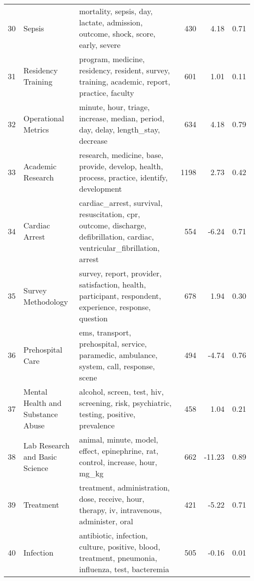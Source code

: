 \begin{tabular}{rllrrr}
    30 &                                       Sepsis &                                             mortality, sepsis, day, lactate, admission, outcome, shock, score, early, severe &             430 &              4.18 &  0.71 \\
    31 &                           Residency Training &                                program, medicine, residency, resident, survey, training, academic, report, practice, faculty &             601 &              1.01 &  0.11 \\
    32 &                          Operational Metrics &                                            minute, hour, triage, increase, median, period, day, delay, length\_stay, decrease &             634 &              4.18 &  0.79 \\
    33 &                            Academic Research &                                 research, medicine, base, provide, develop, health, process, practice, identify, development &            1198 &              2.73 &  0.42 \\
    34 &                               Cardiac Arrest &  cardiac\_arrest, survival, resuscitation, cpr, outcome, discharge, defibrillation, cardiac, ventricular\_fibrillation, arrest &             554 &             -6.24 &  0.71 \\
    35 &                           Survey Methodology &                      survey, report, provider, satisfaction, health, participant, respondent, experience, response, question &             678 &              1.94 &  0.30 \\
    36 &                             Prehospital Care &                                    ems, transport, prehospital, service, paramedic, ambulance, system, call, response, scene &             494 &             -4.74 &  0.76 \\
    37 &            Mental Health and Substance Abuse &                                      alcohol, screen, test, hiv, screening, risk, psychiatric, testing, positive, prevalence &             458 &              1.04 &  0.21 \\
    38 &               Lab Research and Basic Science &                                              animal, minute, model, effect, epinephrine, rat, control, increase, hour, mg\_kg &             662 &            -11.23 &  0.89 \\
    39 &                                    Treatment &                                   treatment, administration, dose, receive, hour, therapy, iv, intravenous, administer, oral &             421 &             -5.22 &  0.71 \\
    40 &                                    Infection &                           antibiotic, infection, culture, positive, blood, treatment, pneumonia, influenza, test, bacteremia &             505 &             -0.16 &  0.01 \\
\bottomrule
\end{tabular}

